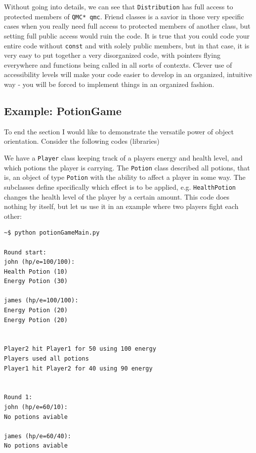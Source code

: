Without going into details, we can see that \verb+Distribution+ has full access to protected members of \verb+QMC* qmc+. Friend classes is a savior in those very specific cases when you really need full access to protected members of another class, but setting full public access would ruin the code. It is true that you could code your entire code without \verb+const+ and with solely public members, but in that case, it is very easy to put together a very disorganized code, with pointers flying everywhere and functions being called in all sorts of contexts. Clever use of accessibility levels will make your code easier to develop in an organized, intuitive way - you will be forced to implement things in an organized fashion.


\subsection{Example: PotionGame}
\label{sec:PotionGame}

To end the section I would like to demonstrate the versatile power of object orientation. Consider the following codes (libraries)

\vspace{0.5 cm}



We have a \verb+Player+ class keeping track of a players energy and health level, and which potions the player is carrying. The \verb+Potion+ class described all potions, that is, an object of type \verb+Potion+ with the ability to affect a player in some way. The subclasses define specifically which effect is to be applied, e.g. \verb+HealthPotion+ changes the health level of the player by a certain amount. This code does nothing by itself, but let us use it in an example where two players fight each other:

\vspace{0.5 cm}


\begin{verbatim}
~$ python potionGameMain.py 

Round start: 
john (hp/e=100/100):
Health Potion (10)
Energy Potion (30)

james (hp/e=100/100):
Energy Potion (20)
Energy Potion (20)


Player2 hit Player1 for 50 using 100 energy
Players used all potions
Player1 hit Player2 for 40 using 90 energy


Round 1: 
john (hp/e=60/10):
No potions aviable

james (hp/e=60/40):
No potions aviable

\end{verbatim}



